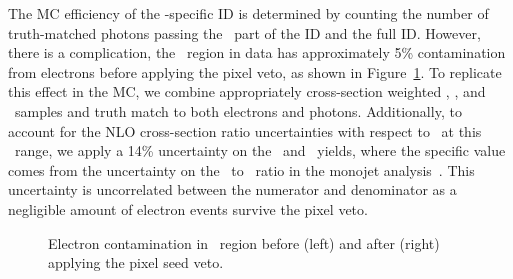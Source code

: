 The MC efficiency of the \Pgg-specific ID is determined by counting the number of truth-matched photons passing the \egamma\ part of the ID and the full ID. 
However, there is a complication, the \gj\ region in data has approximately 5\% contamination from electrons before applying the pixel veto, as shown in Figure~\ref{fig:pvsf_contam}. 
To replicate this effect in the MC, we combine appropriately cross-section weighted \gj, \wj, and \ttbar\ samples and truth match to both electrons and photons. 
Additionally, to account for the NLO cross-section ratio uncertainties with respect to \gj\ at this \pt\ range, we apply a 14\% uncertainty on the \wj\ and \ttbar\ yields, where the specific value comes from the uncertainty on the \gj\ to \wj\ ratio in the monojet analysis~\cite{Monojet2016}.
This uncertainty is uncorrelated between the numerator and denominator as a negligible amount of electron events survive the pixel veto.

\begin{figure}[htbp]
  \centering
  \caption{
    Electron contamination in \gj\ region before (left) and after (right) applying the pixel seed veto.
  }
  \label{fig:pvsf_contam}
\end{figure}
 
